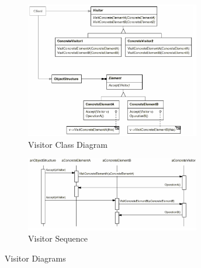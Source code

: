 \documentclass[11pt]{article}
\begin{document}
\begin{figure}[h]
  \centering
  \begin{subfigure}{0.4\textwidth}
    \centering
    \includegraphics[width=3in]{img/visitor.png}
    \caption{Visitor Class Diagram \label{fig:visitor-class-diagram}}
  \end{subfigure}
  \hfill
  \begin{subfigure}{0.4\textwidth}
    \centering
    \includegraphics[width=3in]{img/visitor_sequence.png}
    \caption{Visitor Sequence \label{fig:visitor-sequence}}
  \end{subfigure}
  \caption{
    Visitor Diagrams
    \label{fig:visitor-diagrams}
  }
\end{figure}
\end{document}
